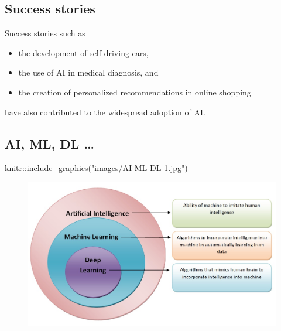 \documentclass[
  letterpaper,
  DIV=11,
  numbers=noendperiod]{scrartcl}
\newenvironment{Shaded}{\begin{snugshade}}{\end{snugshade}}
\newcommand{\FunctionTok}[1]{\textcolor[rgb]{0.28,0.35,0.67}{#1}}
\newcommand{\NormalTok}[1]{\textcolor[rgb]{0.00,0.23,0.31}{#1}}
\newcommand{\SpecialCharTok}[1]{\textcolor[rgb]{0.37,0.37,0.37}{#1}}
\newcommand{\StringTok}[1]{\textcolor[rgb]{0.13,0.47,0.30}{#1}}
\begin{document}
\hypertarget{success-stories}{%
\subsection{Success stories}\label{success-stories}}

Success stories such as

\begin{itemize}
\item
  the development of self-driving cars,
\item
  the use of AI in medical diagnosis, and
\item
  the creation of personalized recommendations in online shopping
\end{itemize}

have also contributed to the widespread adoption of AI.

\hypertarget{ai-ml-dl}{%
\subsection{AI, ML, DL \ldots{}}\label{ai-ml-dl}}

\begin{Shaded}
\begin{Highlighting}[]
\NormalTok{knitr}\SpecialCharTok{::}\FunctionTok{include\_graphics}\NormalTok{(}\StringTok{"images/AI{-}ML{-}DL{-}1.jpg"}\NormalTok{)}
\end{Highlighting}
\end{Shaded}

\begin{figure}[H]

{\centering \includegraphics[width=1\textwidth,height=\textheight]{images/AI-ML-DL-1.jpg}

}

\end{figure}
\end{document}
